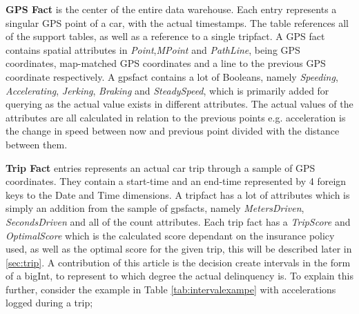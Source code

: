 \textbf{GPS Fact} is the center of the entire data warehouse. Each entry represents a singular GPS point of a car, with the actual timestamps. The table references all of the support tables, as well as a reference to a single tripfact. A GPS fact contains spatial attributes in \textit{Point},\textit{MPoint} and \textit{PathLine}, being GPS coordinates, map-matched GPS coordinates and a line to the previous GPS coordinate respectively. A gpsfact contains a lot of Booleans, namely \textit{Speeding}, \textit{Accelerating}, \textit{Jerking}, \textit{Braking} and \textit{SteadySpeed}, which is primarily added for querying as the actual value exists in different attributes. The actual values of the attributes are all calculated in relation to the previous points e.g. acceleration is the change in speed between now and previous point divided with the distance between them.

\textbf{Trip Fact} entries represents an actual car trip through a sample of GPS coordinates. They contain a start-time and an end-time represented by 4 foreign keys to the Date and Time dimensions. A tripfact has a lot of attributes which is simply an addition from the sample of gpsfacts, namely \textit{MetersDriven}, \textit{SecondsDriven} and all of the count attributes. Each trip fact has a \textit{TripScore} and \textit{OptimalScore} which is the calculated score dependant on the insurance policy used, as well as the optimal score for the given trip, this will be described later in \ref{sec:trip}. A contribution of this article is the decision create intervals in the form of a bigInt, to represent to which degree the actual delinquency is. To explain this further, consider the example in Table \ref{tab:intervalexampe} with accelerations logged during a trip; 

